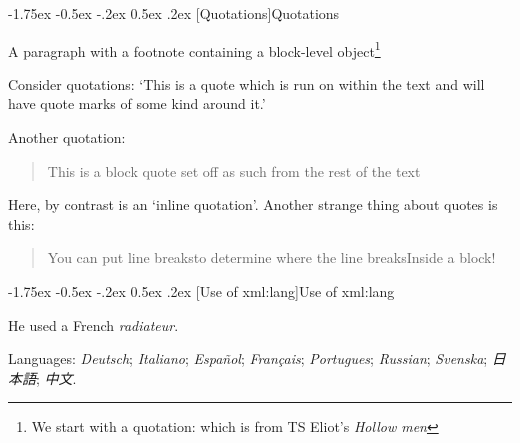 \documentclass[11pt,twoside]{article}\makeatletter
\makeatletter
\renewcommand\section{\@startsection {section}{1}{\z@}%
     {-1.75ex \@plus -0.5ex \@minus -.2ex}%
     {0.5ex \@plus .2ex}%
     {\reset@font\Large\bfseries\sffamily}}
\makeatother
\begin{document}
\section[Quotations]{Quotations}\par
A paragraph with a footnote containing a block-level object\footnote{We start with a quotation:
 which is from TS Eliot's \textit{Hollow men}}\par
Consider quotations: ‘This is a quote which is run on within the text and will have quote marks of some kind around it.’\par
Another quotation: \begin{quote}This is a block quote set off as such from the rest of the text\end{quote}\par
Here, by contrast is an ‘inline quotation’. Another strange thing about quotes is this: \begin{quote}You can put line breaks{\hskip1pt}\newline to determine where the line breaks{\hskip1pt}\newline Inside a block!\end{quote}
\section[Use of xml:lang]{Use of xml:lang}\par
He used a French \textit{radiateur}.\par
Languages: \textit{Deutsch}; \textit{Italiano}; \textit{Español}; \textit{Français}; \textit{Portugues}; \textit{Russian}; \textit{Svenska}; \textit{日本語}; \textit{中文}.
\end{document}
